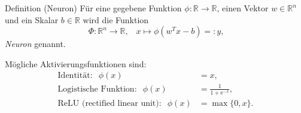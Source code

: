 \documentclass[10pt]{beamer} %
\newcommand{\RR}{\ensuremath{\mathbb{R}}}
\newcommand{\Rnv}{\ensuremath{\mathbb{R}^{n}}}
\begin{document}
\begin{frame}
   \begin{block}{Definition (Neuron)}
      \label{def_neuron}
      Für eine gegebene Funktion $\phi: \RR \rightarrow \RR$, einen Vektor $w \in \Rnv$ und ein Skalar $b \in \RR$ wird die Funktion 
      \[ \
      \Phi: \RR^n \rightarrow \RR, \; \; \; x \mapsto \phi(w^T x -b)=:y,
      \]
      \textit{Neuron} genannt.
   \end{block}
   \pause
   Mögliche Aktivierungsfunktionen sind:
   \begin{align*}
      \text{Identität}: \; \;\phi(x)&=x, \\
      \text{Logistische Funktion}: \; \;\phi(x)&=\frac{1}{1+\mathrm{e}^{-x}}, \\
      \text{ReLU (rectified linear unit)}: \; \;\phi(x)&=\max\{0,x\}.
  \end{align*}
\end{frame}
\end{document}
